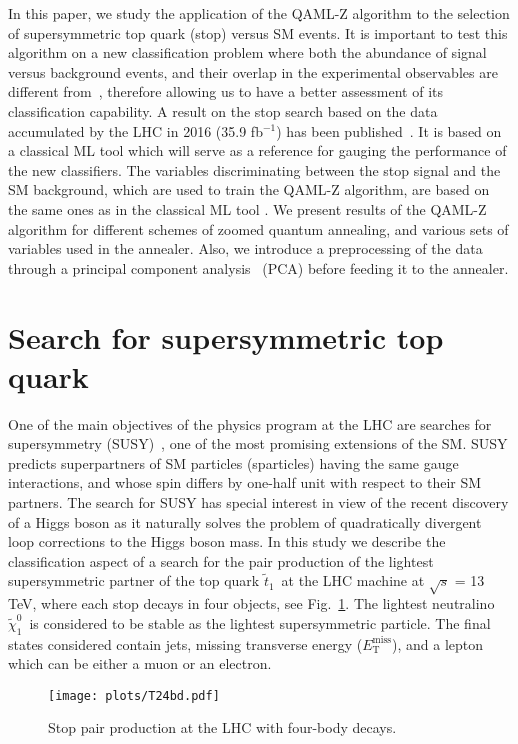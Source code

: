 \documentclass{article}
\newcommand{\met}{\ensuremath{E_\mathrm{T}^\mathrm{miss}}}
\newcommand{\stp}{\ensuremath{\tilde{t}_{1}}~}
\newcommand{\lsp}{\ensuremath{\tilde{\chi}_{1}^{0}}~}
\begin{document}
In this paper, we study the application of the QAML-Z algorithm to
the selection of supersymmetric top quark (stop) versus SM events. It is
important to test this algorithm on a new classification problem where
both the abundance of signal versus background events, and their overlap
in the experimental observables are different from~\cite{qamlz},
therefore allowing us to have a better assessment of its classification
capability.
A result on the stop search based on the data accumulated by the LHC in 
2016 (35.9 fb$^{-1}$) has been published~\cite{st4bd}. It is based on a 
classical ML tool which will serve as a reference for gauging the 
performance of the new classifiers. The variables discriminating between 
the stop signal and the SM background, which are used to train the QAML-Z 
algorithm, are based on the same ones as in the classical ML tool 
\cite{st4bd}. We present results of the QAML-Z algorithm for different 
schemes of zoomed quantum annealing, and various sets of variables used in 
the annealer. Also, we introduce a preprocessing of the data through a 
principal component analysis~\cite{pca} (PCA) before feeding it to the 
annealer.

\section{Search for supersymmetric top quark}
\label{s:stop}

One of the main objectives of the physics program at the LHC are searches 
for supersymmetry (SUSY)~\cite{SUSY0,SUSY1,SUSY2,SUSY3,SUSY4,Martin}, one 
of the most promising extensions of the SM. SUSY predicts superpartners of 
SM particles (sparticles) having the same gauge interactions, and whose 
spin differs by one-half unit with respect to their SM partners. The 
search for SUSY has special interest in view of the recent discovery of a 
Higgs boson \cite{HgDisc1,HgDisc2} as it naturally solves the problem of 
quadratically divergent loop corrections to the Higgs boson mass. In this 
study we describe the classification aspect of a search for the pair 
production of the lightest supersymmetric partner of the top quark \stp at 
the LHC machine at $\sqrt{s}$ = 13 TeV, where each stop decays in four 
objects, see Fig.~\ref{fig:4bod}. The lightest neutralino \lsp is 
considered to be stable as the lightest supersymmetric particle. The final 
states considered contain jets, missing transverse energy (\met), and a 
lepton which can be either a muon or an electron.

\begin{figure}[!htbp]
\begin{center}
\texttt{[image: plots/T24bd.pdf]} 
\end{center}
\caption{Stop pair production at the LHC with four-body decays.}
\label{fig:4bod}
\end{figure}
\end{document}
